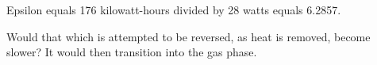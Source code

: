 Epsilon equals 176 kilowatt-hours divided by 28 watts equals 6.2857.  

Would that which is attempted to be reversed, as heat is removed, become slower? It would then transition into the gas phase.